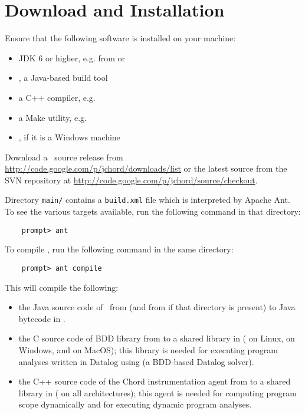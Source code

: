 \section{Download and Installation}
\label{sec:download-and-installation}

Ensure that the following software is installed on your machine:

\begin{itemize}
\item
JDK 6 or higher, e.g. from  or
\item
{}, a Java-based build tool
\item
a C++ compiler, e.g. 
\item
a Make utility, e.g. 
\item
{}, if it is a Windows machine
\end{itemize}

Download a \Chord\ source release from \url{http://code.google.com/p/jchord/downloads/list} or
the latest source from the SVN repository at \url{http://code.google.com/p/jchord/source/checkout}.

Directory {\tt main/} contains a {\tt build.xml} file which is interpreted by Apache Ant.
To see the various targets available, run the following command in that directory:

\begin{verbatim}
    prompt> ant
\end{verbatim}

\noindent To compile \Chord, run the following command in the same directory:

\begin{verbatim}
    prompt> ant compile
\end{verbatim}

\noindent This will compile the following:
\begin{itemize}
\item
the Java source code of \Chord\ from  (and from  if that directory is present) to Java bytecode in .
\item
the C source code of BDD library  from  to a shared library in  ( on Linux,  on Windows, and  on MacOS); this library is needed for executing program analyses written in Datalog using  (a BDD-based Datalog solver).
\item
the C++ source code of the Chord instrumentation agent from  to a shared library in  ( on all architectures); this agent is needed for computing program scope dynamically and for executing dynamic program analyses.
\end{itemize}


